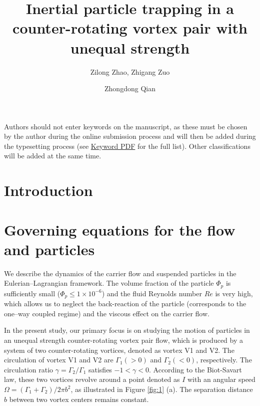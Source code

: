 \documentclass[lineno]{JFM-FLM_Au}
\title{Inertial particle trapping in a counter-rotating vortex pair with unequal  strength}
\author{Zilong Zhao\aff{1}, Zhigang Zuo\aff{2} \and Zhongdong Qian\aff{1}}
\affiliation{\aff{1}Department, Institution, City, Country
\aff{2}Department, Institution, City, Country}
\begin{document}
\maketitle

\begin{abstract}

\end{abstract}

\begin{keywords}
Authors should not enter keywords on the manuscript, as these must be chosen by the author during the online submission process and will then be added during the typesetting process (see \href{https://www.cambridge.org/core/services/aop-file-manager/file/61436b61ff7f3cfab749ce3a/JFM-Keywords-Sept-2021.pdf.}{Keyword PDF} for the full list).  Other classifications will be added at the same time.
\end{keywords}


\section{Introduction}
\label{sec:1}

\section{Governing equations for the flow and particles}
\label{sec:2}
We describe the dynamics of the carrier flow and suspended particles in the Eulerian--Lagrangian framework. The volume fraction of the particle $\Phi_p$ is sufficiently small ($\Phi_p \le 1 \times 10^{-6}$) and the fluid Reynolds number $Re$ is very high, which allows us to neglect the back-reaction of the particle (corresponds to the one--way coupled regime) and the viscous effect on the carrier flow.

In the present study, our primary focus is on studying the motion of particles in an unequal strength counter-rotating vortex pair flow, which is produced by a system of two counter-rotating vortices, denoted as vortex V1 and V2. The circulation of vortex V1 and V2 are $\Gamma_1(> 0)$ and $\Gamma_2(< 0)$, respectively. The circulation ratio $\gamma = \Gamma_2/ \Gamma_1$ satisfies $-1 < \gamma < 0$. According to the Biot-Savart law, these two vortices revolve around a point denoted as $I$ with an angular speed $\Omega = (\Gamma_1+\Gamma_2)/2\pi b^2$, as illustrated in Figure \ref{fig:1} (a). The separation distance $b$ between two vortex centers remains constant. 
\end{document}

